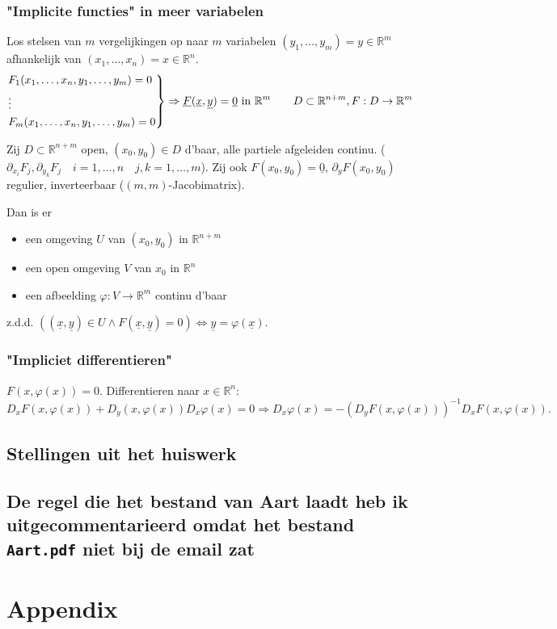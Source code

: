 \documentclass[a4paper]{exam}
\theoremstyle{definition}
\newcommand{\reals}{\mathbb{R}}
\begin{document}
	
	\subsubsection{"Implicite functies" in meer variabelen}
	Los stelsen van $m$ vergelijkingen op naar $m$ variabelen $(y_1, \dots ,y_m) = y \in \reals^m$ afhankelijk van $ (x_1, \dots , x_n) = x \in \reals^n $.
	\[
	\begin{rcases*}
	F_1(x_1,\dots,x_n,y_1,\dots,y_m)=0 \\
	\vdots \\
	F_m(x_1,\dots,x_n,y_1,\dots,y_m)=0
	\end{rcases*} \Rightarrow \underline{F}(\underline{x},\underline{y})=\underline{0} \text{ in } \reals^m \qquad D \subset \reals^{n+m}, F: D \rightarrow \reals^m
	\]
	
	 Zij $ D\subset \reals^{n+m} $ open, $ (x_0, y_0) \in D $ d'baar, alle partiele afgeleiden continu. ($ \partial_{x_i}F_j , \partial_{y_k}F_j \quad i=1,\dots,n \quad j,k=1,\dots,m $). Zij ook $ F(x_0, y_0) = \underline{0}$, $ \partial_y F(x_0,y_0) $ regulier, inverteerbaar ($ (m,m) $-Jacobimatrix).
	
	Dan is er \begin{itemize}
		\item[] een omgeving $ U $ van $ (x_0,y_0) $ in $ \reals^{n+m} $
		\item[] een open omgeving $V$ van $x_0$ in $\reals^n$
		\item[] een afbeelding $ \varphi : V\rightarrow \reals^m $ continu d'baar 
	\end{itemize}
	z.d.d. $ ((\underline{x},\underline{y}) \in U \wedge F(\underline{x},\underline{y})=0) \Leftrightarrow \underline{y}=\varphi (\underline{x}). $
	
	\subsubsection{"Impliciet differentieren"}
	$ F(x,\varphi(x))=0 $. Differentieren naar $ x\in \reals^n $:
	\[ D_x F(x,\varphi(x)) + D_y (x,\varphi(x))D_x \varphi(x) = 0 \Rightarrow D_x \varphi(x) = -(D_y F(x,\varphi(x)))^{-1} D_x F(x,\varphi(x)). \]
	
	\subsection{Stellingen uit het huiswerk}
	
	\subsection{{\color{blue}De regel die het bestand van Aart laadt heb ik uitgecommentarieerd omdat het bestand \texttt{Aart.pdf} niet bij de email zat}}
	
	
	\appendix
	\section{Appendix}
	
	\newpage
	
	\newpage
	\begin{scriptsize}\printindex\end{scriptsize}
\end{document}
